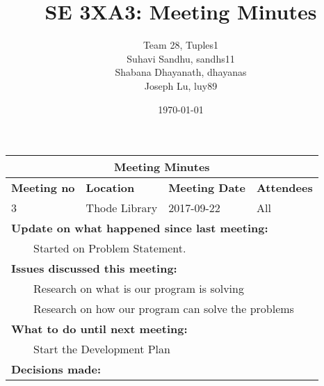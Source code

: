 \documentclass{article}
\title{SE 3XA3: Meeting Minutes}
\author{Team 28, Tuples1
		\\ Suhavi Sandhu, sandhs11
		\\ Shabana Dhayanath, dhayanas
		\\ Joseph Lu, luy89
}
\date{\today}
\newcommand{\tabitem}{~~\llap{\textbullet}~~}
\begin{document}
\begin{tabularx}{\textwidth}{ |X||X||X||X| }
    \hline
    \hline
        \multicolumn{4}{|c|}{\textbf{Meeting Minutes}} \\ 
    \hline
    \hline

    \textbf{Meeting no} & \textbf{Location} & \textbf{Meeting Date} & \textbf{Attendees}\\
    \hline

    3 & Thode Library & 2017-09-22 & All\\

    \hline

    \multicolumn{4}{|l|}{\textbf{Update on what happened since last meeting: }} \\
		
	\multicolumn{4}{|l|}{\tabitem Started on Problem Statement.}\\

    \hline
    
    \multicolumn{4}{|l|}{\textbf{Issues discussed this meeting: }}\\

    \multicolumn{4}{|l|}{\tabitem Research on what is our program is solving}\\
    \multicolumn{4}{|l|}{\tabitem Research on how our program can solve the problems}\\ 

    \hline

    \multicolumn{4}{|l|}{\textbf{What to do until next meeting: }} \\

    \multicolumn{4}{|l|}{\tabitem Start the Development Plan}\\

    \hline
        \multicolumn{4}{|l|}{\textbf{Decisions made: }} \\
    \hline
\end{tabularx}
\end{document}
